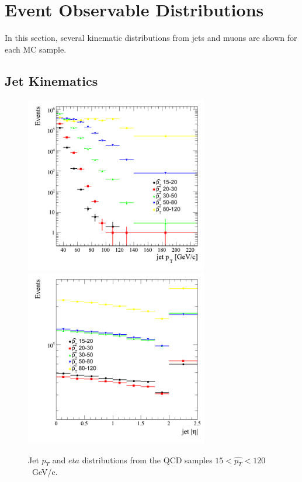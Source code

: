 \section{Event Observable Distributions}

In this section, several kinematic distributions from jets and muons 
are shown for each MC sample.


\subsection{Jet Kinematics}
\begin{figure}[htbp]
  \begin{center}
    \includegraphics[width=80mm]{Figures/jet_ptqcdbinned.png}
    \includegraphics[width=80mm]{Figures/jet_eta_qcdbinned.png}
  \end{center}
  \caption{Jet $p_T$ and $eta$ distributions from the QCD samples $15<\hat{p_T}<120$~GeV/c.}
  \label{fig:jet_pt_QCD}
\end{figure}

